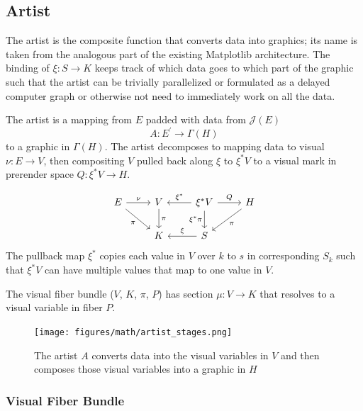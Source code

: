 \documentclass[../main.tex]{subfiles}
\begin{document}
\subsection{Artist}
\label{sec:artist}
The artist is the composite function that converts data into graphics; its name is taken from the analogous part of the existing Matplotlib architecture. The binding of $\xi:S \rightarrow K$ keeps track of which data goes to which part of the graphic such that the artist can be trivially parallelized or formulated as a delayed computer graph or otherwise not need to immediately work on all the data. 

The artist is a mapping from $E$ padded with data from $\mathcal{J}(E)$
\begin{equation}
    A: E^\prime \rightarrow \Gamma(H)
\end{equation}
to a graphic in $\Gamma(H)$. The artist decomposes to mapping data to visual $\nu:E\rightarrow V$, then  compositing $V$ pulled back along $\xi$ to $\xi^*V$ to a visual mark in prerender space $Q:\xi^*V\rightarrow H$. 

\begin{equation}
    \label{eq:artist_diagram}
    \begin{tikzcd}
        E \arrow[r, "\nu"] \arrow[rd, "\pi"'] & V \arrow[d, "\pi"] & \xi^*V \arrow[r, "Q"] \arrow[d, "\xi^*\pi"'] \arrow[l, "\xi^*"'] & H \arrow[ld, "\pi"] \\
                                              & K                  & S \arrow[l, "\xi"']                                              &                    
        \end{tikzcd}
\end{equation}
The pullback map $\xi^*$ copies each value in $V$ over $k$ to $s$ in corresponding $S_k$ such that $\xi^*V$ can have multiple values that map to one value in $V$. 

The visual fiber bundle ($V$, $K$, $\pi$, $P$) has section $\mu: V \rightarrow K$ that resolves to a visual variable \cite{bertinIIPropertiesGraphic2011,munznerMarksChannels,} in fiber $P$.
\begin{figure}
    \texttt{[image: figures/math/artist\_stages.png]}
    \caption{The artist $A$ converts data into the visual variables in $V$ and then composes those visual variables into a graphic in $H$}
    \label{fig:artist_stages}
\end{figure}
\subsubsection {Visual Fiber Bundle}
\end{document}
